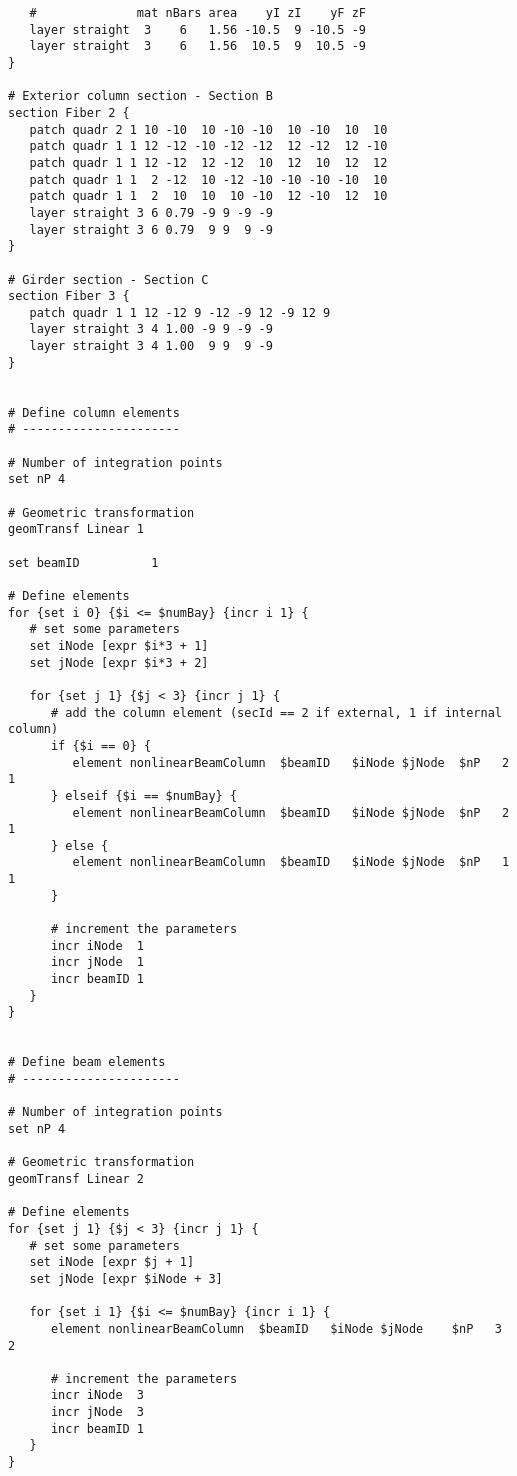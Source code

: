 \documentclass[12pt]{article}
\begin{document}
{\begin{verbatim}
   #              mat nBars area    yI zI    yF zF
   layer straight  3    6   1.56 -10.5  9 -10.5 -9
   layer straight  3    6   1.56  10.5  9  10.5 -9
}

# Exterior column section - Section B
section Fiber 2 {
   patch quadr 2 1 10 -10  10 -10 -10  10 -10  10  10
   patch quadr 1 1 12 -12 -10 -12 -12  12 -12  12 -10
   patch quadr 1 1 12 -12  12 -12  10  12  10  12  12
   patch quadr 1 1  2 -12  10 -12 -10 -10 -10 -10  10
   patch quadr 1 1  2  10  10  10 -10  12 -10  12  10
   layer straight 3 6 0.79 -9 9 -9 -9
   layer straight 3 6 0.79  9 9  9 -9
}

# Girder section - Section C
section Fiber 3 {
   patch quadr 1 1 12 -12 9 -12 -9 12 -9 12 9
   layer straight 3 4 1.00 -9 9 -9 -9
   layer straight 3 4 1.00  9 9  9 -9
}


# Define column elements
# ----------------------

# Number of integration points
set nP 4

# Geometric transformation
geomTransf Linear 1

set beamID          1

# Define elements
for {set i 0} {$i <= $numBay} {incr i 1} {
   # set some parameters
   set iNode [expr $i*3 + 1]
   set jNode [expr $i*3 + 2]

   for {set j 1} {$j < 3} {incr j 1} {    
      # add the column element (secId == 2 if external, 1 if internal column)
      if {$i == 0} {
         element nonlinearBeamColumn  $beamID   $iNode $jNode  $nP   2    1
      } elseif {$i == $numBay} {
         element nonlinearBeamColumn  $beamID   $iNode $jNode  $nP   2    1
      } else {
         element nonlinearBeamColumn  $beamID   $iNode $jNode  $nP   1    1
      }

      # increment the parameters
      incr iNode  1
      incr jNode  1
      incr beamID 1
   }
}


# Define beam elements
# ----------------------

# Number of integration points
set nP 4

# Geometric transformation
geomTransf Linear 2

# Define elements
for {set j 1} {$j < 3} {incr j 1} {    
   # set some parameters
   set iNode [expr $j + 1]
   set jNode [expr $iNode + 3]

   for {set i 1} {$i <= $numBay} {incr i 1} {
      element nonlinearBeamColumn  $beamID   $iNode $jNode    $nP   3      2

      # increment the parameters
      incr iNode  3
      incr jNode  3
      incr beamID 1
   }
}


\end{verbatim}}
\end{document}
